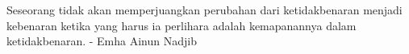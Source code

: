 \documentclass{jtetiskripsi}
\begin{document}
\motto
Seseorang tidak akan memperjuangkan perubahan dari ketidakbenaran menjadi kebenaran ketika yang harus ia perlihara adalah kemapanannya dalam ketidakbenaran. - Emha Ainun Nadjib

\begin{onehalfspace}
\clearpage
{}
{}
\tableofcontents
\clearpage
{}
{}
\listoftables
\clearpage
{}
{}
\listoffigures
\end{onehalfspace}

\end{document}
